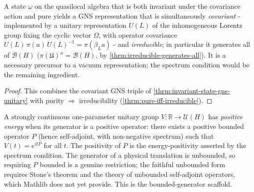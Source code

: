 \begin{theorem}
    \label{thrm:irreducible-covariant-representation}
    \leanok
    A state $\omega$ on the quasilocal algebra that is both invariant under the covariance action and pure yields a GNS representation that is simultaneously \emph{covariant} - implemented by a unitary representation $U(L)$ of the inhomogeneous Lorentz group fixing the cyclic vector $\Omega$, with operator covariance $U(L)\,\pi(a)\,U(L)^{-1} = \pi(\beta_L a)$ - and \emph{irreducible}; in particular it generates all of $\mathcal{B}(H)$ ($\pi(\mathfrak{U})'' = \mathcal{B}(H)$, by \ref{thrm:irreducible-generates-all}). It is a necessary precursor to a vacuum representation; the spectrum condition would be the remaining ingredient.
\end{theorem}
\begin{proof}
    \leanok
    This combines the covariant GNS triple of \ref{thrm:invariant-state-gns-unitary} with purity $\Rightarrow$ irreducibility (\ref{thrm:pure-iff-irreducible}).
\end{proof}

\begin{definition}
    \label{def:positive-energy}
    \leanok
    A strongly continuous one-parameter unitary group $V : \mathbb{R} \to \mathcal{U}(H)$ has \emph{positive energy} when its generator is a positive operator: there exists a positive bounded operator $P$ (hence self-adjoint, with non-negative spectrum) such that $V(t) = e^{i t P}$ for all $t$. The positivity of $P$ is the energy-positivity asserted by the spectrum condition. The generator of a physical translation is unbounded, so requiring $P$ bounded is a genuine restriction; the faithful unbounded form requires Stone's theorem and the theory of unbounded self-adjoint operators, which Mathlib does not yet provide. This is the bounded-generator scaffold.
\end{definition}

